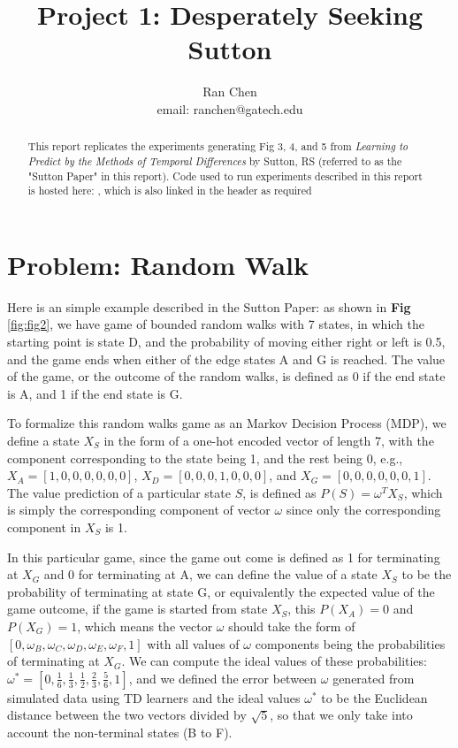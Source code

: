\documentclass[10pt]{article}
\author{Ran Chen \\ email: ranchen@gatech.edu\vspace{-2ex}}
\title{\vspace{-1.8cm}Project 1: Desperately Seeking Sutton}
\date{}
\begin{document}
\maketitle
\thispagestyle{fancy}


\begin{abstract}
This report replicates the experiments generating Fig 3, 4, and 5 from \textit{Learning to Predict by the Methods of Temporal Differences} by Sutton, RS (referred to as the "Sutton Paper" in this report). Code used to run experiments described in this report is hosted here: , which is also linked in the header as required
\end{abstract}

\section{Problem: Random Walk} \label{problem}

Here is an simple example described in the Sutton Paper: as shown in \textbf{Fig} \ref{fig:fig2}, we have game of bounded random walks with 7 states, in which the starting point is state D, and the probability of moving either right or left is 0.5, and the game ends when either of the edge states A and G is reached. The value of the game, or the outcome of the random walks, is defined as 0 if the end state is A, and 1 if the end state is G. \par

To formalize this random walks game as an Markov Decision Process (MDP), we define a state $X_S$ in the form of a one-hot encoded vector of length 7, with the component corresponding to the state being 1, and the rest being 0, e.g., $X_A=[1,0,0,0,0,0,0]$, $X_D=[0,0,0,1,0,0,0]$, and $X_G=[0,0,0,0,0,0,1]$. The value prediction of a particular state $S$, is defined as $P(S)=\omega^TX_S$, which is simply the corresponding component of vector $\omega$ since only the corresponding component in $X_S$ is 1. \par

In this particular game, since the game out come is defined as 1 for terminating at $X_G$ and 0 for terminating at A, we can define the value of a state $X_S$ to be the probability of terminating at state G, or equivalently the expected value of the game outcome, if the game is started from state $X_S$, this $P(X_A)=0$ and $P(X_G)=1$, which means the vector $\omega$ should take the form of $[0,\omega_B,\omega_C,\omega_D,\omega_E,\omega_F,1]$ with all values of $\omega$ components being the probabilities of terminating at $X_G$. We can compute the ideal values of these probabilities: $\omega^*=[0,\frac{1}{6},\frac{1}{3},\frac{1}{2},\frac{2}{3},\frac{5}{6},1]$, and we defined the error between $\omega$ generated from simulated data using TD learners and the ideal values $\omega^*$ to be the Euclidean distance between the two vectors divided by $\sqrt{5}$, so that we only take into account the non-terminal states (B to F). \par
\end{document}
